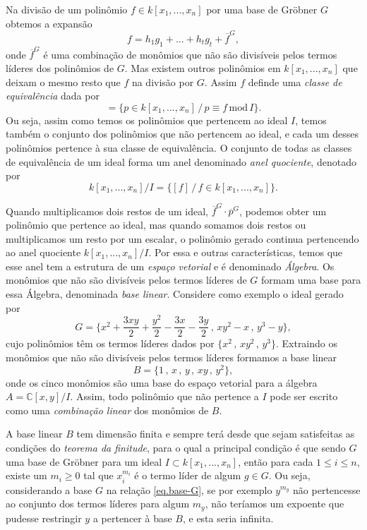 \documentclass[a4paper,12pt,oneside,onecolumn,final,fleqn]{repUERJ}
\begin{document}
Na divisão de um polinômio $f\in k[x_1,...,x_n]$ por uma base de Gr\"obner $G$ obtemos a expansão
\begin{equation*}
f=h_1g_1+...+h_tg_t+\overline{f}^G,
\end{equation*} 
onde $\overline{f}^G$ é uma combinação de monômios que não são divisíveis pelos termos líderes dos polinômios de $G$. Mas existem outros polinômios em $k[x_1,...,x_n]$ que deixam o mesmo resto que $f$ na divisão por $G$. Assim $f$ definde uma {\it classe de equivalência} dada por
\begin{equation*}
[f]=\{p\in k[x_1,...,x_n]\,/\,p\equiv f\, \text{mod}\, I\}.
\end{equation*}
Ou seja, assim como temos os polinômios que pertencem ao ideal $I$, temos também o conjunto dos polinômios que não pertencem ao ideal, e cada um desses polinômios pertence à sua classe de equivalência. O conjunto de todas as classes de equivalência de um ideal forma um anel denominado {\it anel quociente}, denotado por
\begin{equation*}
k[x_1,...,x_n]/I=\{[f]\,/\,f\in k[x_1,...,x_n]\}.
\end{equation*}

Quando multiplicamos dois restos de um ideal, $\overline{f}^G\cdot\overline{p}^G$, podemos obter um polinômio que pertence ao ideal, mas quando somamos dois restos ou multiplicamos um resto por um escalar, o polinômio gerado continua pertencendo ao anel quociente $k[x_1,...,x_n]/I$. Por essa e outras características, temos que esse anel tem a estrutura de um {\it espaço vetorial} e é denominado {\it Álgebra}. Os monômios que não são divisíveis pelos termos líderes de $G$ formam uma base para essa Álgebra, denominada {\it base linear}. Considere como exemplo o ideal gerado por 
\begin{equation}\label{eq.base-G}
G=\{x^2+\frac{3xy}{2}+\frac{y^2}{2}-\frac{3x}{2}-\frac{3y}{2}\,,\,xy^2-x\,,\,y^3-y\},
\end{equation}
cujo polinômios têm os termos líderes dados por $\{x^2\,,\,xy^2\,,\,y^3\}$. Extraindo os monômios que não são divisíveis pelos termos líderes formamos a base linear
\begin{equation*}
B=\{1\,,\,x\,,\,y\,,\,xy\,,\,y^2\},
\end{equation*}
onde os cinco monômios são uma base do espaço vetorial para a álgebra $A={\mathbb C}[x,y]/I$. Assim, todo polinômio que não pertence a $I$ pode ser escrito como uma {\it combinação linear} dos monômios de $B$.

A base linear $B$ tem dimensão finita e sempre terá desde que sejam satisfeitas as condições do {\it teorema da finitude}, para o qual a principal condição é que sendo $G$ uma base de Gr\"obner para um ideal $I \subset k[x_1,...,x_n]$, então para cada $1\le i\le n$, existe um $m_i\ge 0$ tal que $x_i^{m_i}$ é o termo líder de algum $g\in G$. Ou seja, considerando a base $G$ na relação \ref{eq.base-G}, se por exemplo $y^{m_y}$ não pertencesse ao conjunto dos termos líderes para algum $m_y$, não teríamos um expoente que pudesse restringir $y$ a pertencer à base $B$, e esta seria infinita.
\end{document}
